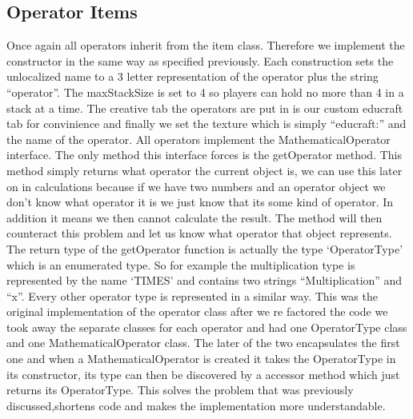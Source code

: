 \subsection{Operator Items}
Once again all operators inherit from the item class. Therefore we implement the constructor in the same way as specified previously. Each construction sets the unlocalized name to a 3 letter representation of the operator plus the string “operator”. The maxStackSize is set to 4 so players can hold no more than 4 in a stack at a time. The creative tab the operators are put in is our custom educraft tab for convinience and finally we set the texture which is simply “educraft:” and the name of the operator. All operators implement the MathematicalOperator interface. The only method this interface forces is the getOperator method. This method simply returns what operator the current object is, we can use this later on in calculations because if we have two numbers and an operator object we don’t know what operator it is we just know that its some kind of operator. In addition it means we then cannot calculate the result. The method will then counteract this problem and let us know what operator that object represents. The return type of the getOperator function is actually the type ‘OperatorType’ which is an enumerated type. So for example the multiplication type is represented by the name ‘TIMES’ and contains two strings “Multiplication” and “x”. Every other operator type is represented in a similar way. This was the original implementation of the operator class after we re factored the code we took away the separate classes for each operator and had one OperatorType class and one MathematicalOperator class. The later of the two encapsulates the first one and when a MathematicalOperator is created it takes the OperatorType in its constructor, its type can then be discovered by a accessor method which just returns its OperatorType. This solves the problem that was previously discussed,shortens code and makes the implementation more understandable.

